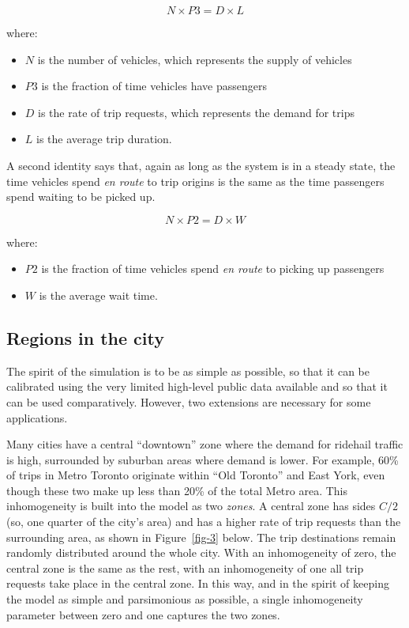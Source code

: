 \documentclass[
  letterpaper,
]{article}
\begin{document}
\[
N \times P3 = D \times L
\]

where:

\begin{itemize}
\item
  \(N\) is the number of vehicles, which represents the supply of
  vehicles
\item
  \(P3\) is the fraction of time vehicles have passengers
\item
  \(D\) is the rate of trip requests, which represents the demand for
  trips
\item
  \(L\) is the average trip duration.
\end{itemize}

A second identity says that, again as long as the system is in a steady
state, the time vehicles spend \emph{en route} to trip origins is the
same as the time passengers spend waiting to be picked up.

\[
N \times P2 = D \times W
\]

where:

\begin{itemize}
\item
  \(P2\) is the fraction of time vehicles spend \emph{en route} to
  picking up passengers
\item
  \(W\) is the average wait time.
\end{itemize}

\hypertarget{extensions}{%
\subsection{Regions in the city}\label{extensions}}

The spirit of the simulation is to be as simple as possible, so that it
can be calibrated using the very limited high-level public data
available and so that it can be used comparatively. However, two
extensions are necessary for some applications.

Many cities have a central ``downtown'' zone where the demand for
ridehail traffic is high, surrounded by suburban areas where demand is
lower. For example, 60\% of trips in Metro Toronto originate within
``Old Toronto'' and East York, even though these two make up less than
20\% of the total Metro area. This inhomogeneity is built into the model
as two \emph{zones}. A central zone has sides \(C/2\) (so, one quarter
of the city's area) and has a higher rate of trip requests than the
surrounding area, as shown in Figure~\ref{fig-3} below. The trip
destinations remain randomly distributed around the whole city. With an
inhomogeneity of zero, the central zone is the same as the rest, with an
inhomogeneity of one all trip requests take place in the central zone.
In this way, and in the spirit of keeping the model as simple and
parsimonious as possible, a single inhomogeneity parameter between zero
and one captures the two zones.
\end{document}
